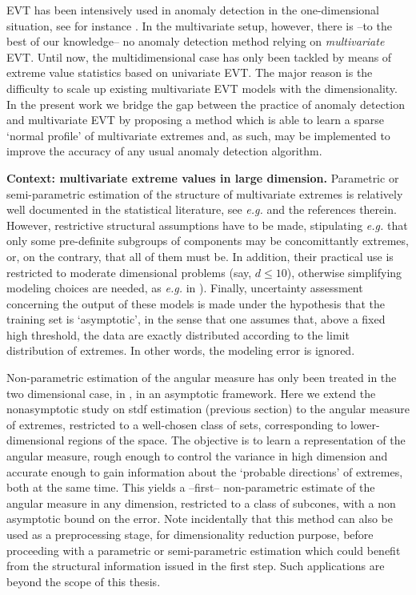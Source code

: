 EVT has been intensively used in anomaly detection in the one-dimensional
situation, see for instance \cite{Roberts99, Roberts2000, Clifton2011, Clifton2008, Lee2008}.
In the multivariate setup, however, there is --to the best of our
knowledge--  no anomaly detection method
relying on \textit{multivariate} EVT. Until now, the multidimensional case has only been  tackled by means of extreme value statistics
based on univariate EVT. The major reason is 
the difficulty to scale up existing multivariate EVT models
with the dimensionality. In the present work we bridge the gap between the practice of anomaly detection and multivariate EVT by proposing a method which is
able to learn a sparse `normal profile' of multivariate extremes and,
as such, may be implemented to improve the accuracy of any usual anomaly detection algorithm.

\textbf{Context: multivariate extreme values in large dimension.}
Parametric or semi-parametric estimation of the structure of multivariate extremes is relatively well documented in the statistical literature, see  \emph{e.g.} \cite{coles1991modeling,fougeres2009models,cooley2010pairwise,sabourinNaveau2012} and the references therein. However, restrictive structural assumptions have to be made, stipulating \emph{e.g.} that only some pre-definite subgroups of components may be concomittantly extremes, or, on the contrary, that all of them must be. In addition, their practical use is restricted to moderate dimensional problems (say, $d\le 10$), otherwise simplifying modeling choices are needed, as \emph{e.g.} in \cite{stephenson2009high}). Finally, uncertainty assessment concerning the output of these models is made under the hypothesis that the training set is `asymptotic', in the sense that one assumes that, above a fixed high threshold, the data are exactly distributed according to the limit distribution of extremes. In other words, the modeling error is ignored. 

Non-parametric estimation of the angular measure has only been treated in the two dimensional case, in \cite{Einmahl2001, Einmahl2009}, in an asymptotic framework. Here we extend the nonasymptotic study on {\sc stdf} estimation (previous section) to the angular measure of extremes, restricted to a well-chosen class of sets, corresponding to lower-dimensional regions of the space. The objective is to learn a representation of the angular measure, rough enough to control the variance in high dimension and accurate enough to gain information about the `probable directions' of extremes, both at the same time. This yields a --first-- non-parametric estimate of the angular measure in any dimension, restricted to a class of subcones, %
with a non asymptotic bound on the error. 
Note incidentally that this method can also be used as a preprocessing stage, for dimensionality reduction purpose, before proceeding with a parametric or semi-parametric estimation which could benefit from the structural information issued in the first step. Such applications are beyond the scope of this thesis.

